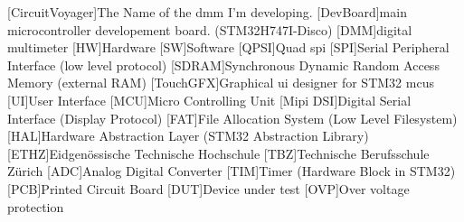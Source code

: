 \begin{acronym}
        [CircuitVoyager]{The Name of the \acs{dmm} I'm developing.}
        [DevBoard]{main microcontroller developement board. (STM32H747I-Disco)}
        [DMM]{digital multimeter}
        [HW]{Hardware}
        [SW]{Software}
        [QPSI]{Quad \acs{spi}}
        [SPI]{Serial Peripheral Interface (low level protocol)}
        [SDRAM]{Synchronous Dynamic Random Access Memory (external RAM)}
        [TouchGFX]{Graphical \acs{ui} designer for STM32 \acs{mcu}s}
        [UI]{User Interface}
        [MCU]{Micro Controlling Unit}
        [Mipi DSI]{Digital Serial Interface (Display Protocol)}
        [FAT]{File Allocation System (Low Level Filesystem)}
        [HAL]{Hardware Abstraction Layer (STM32 Abstraction Library)}
        [ETHZ]{Eidgenössische Technische Hochschule}
        [TBZ]{Technische Berufsschule Zürich}
        [ADC]{Analog Digital Converter}
        [TIM]{Timer (Hardware Block in STM32)}
        [PCB]{Printed Circuit Board}
        [DUT]{Device under test}
        [OVP]{Over voltage protection}
\end{acronym}
